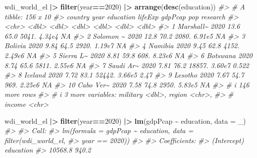 \documentclass[
  xelatex, ja=standard]{bxjsbook}
\newenvironment{Shaded}{\begin{snugshade}}{\end{snugshade}}
\newcommand{\AttributeTok}[1]{\textcolor[rgb]{0.13,0.29,0.53}{#1}}
\newcommand{\CommentTok}[1]{\textcolor[rgb]{0.56,0.35,0.01}{\textit{#1}}}
\newcommand{\DecValTok}[1]{\textcolor[rgb]{0.00,0.00,0.81}{#1}}
\newcommand{\FunctionTok}[1]{\textcolor[rgb]{0.13,0.29,0.53}{\textbf{#1}}}
\newcommand{\NormalTok}[1]{#1}
\newcommand{\SpecialCharTok}[1]{\textcolor[rgb]{0.81,0.36,0.00}{\textbf{#1}}}
\theoremstyle{definition}
\theoremstyle{definition}
\theoremstyle{definition}
\theoremstyle{definition}
\theoremstyle{remark}
\begin{document}
\begin{Shaded}
\begin{Highlighting}[]
\NormalTok{wdi\_world\_el }\SpecialCharTok{|\textgreater{}} \FunctionTok{filter}\NormalTok{(year}\SpecialCharTok{==}\DecValTok{2020}\NormalTok{) }\SpecialCharTok{|\textgreater{}} \FunctionTok{arrange}\NormalTok{(}\FunctionTok{desc}\NormalTok{(education))}
\CommentTok{\#\textgreater{} \# A tibble: 156 x 10}
\CommentTok{\#\textgreater{}    country    year education lifeExp gdpPcap    pop research}
\CommentTok{\#\textgreater{}    \textless{}chr\textgreater{}     \textless{}dbl\textgreater{}     \textless{}dbl\textgreater{}   \textless{}dbl\textgreater{}   \textless{}dbl\textgreater{}  \textless{}dbl\textgreater{}    \textless{}dbl\textgreater{}}
\CommentTok{\#\textgreater{}  1 Marshall\textasciitilde{}  2020     13.6     65.0   5041. 4.34e4   NA    }
\CommentTok{\#\textgreater{}  2 Solomon \textasciitilde{}  2020     12.8     70.2   2080. 6.91e5   NA    }
\CommentTok{\#\textgreater{}  3 Bolivia    2020      9.84    64.5   2920. 1.19e7   NA    }
\CommentTok{\#\textgreater{}  4 Namibia    2020      9.45    62.8   4152. 2.49e6   NA    }
\CommentTok{\#\textgreater{}  5 Sierra L\textasciitilde{}  2020      8.81    59.8    608. 8.23e6   NA    }
\CommentTok{\#\textgreater{}  6 Botswana   2020      8.74    65.6   5811. 2.55e6   NA    }
\CommentTok{\#\textgreater{}  7 Saudi Ar\textasciitilde{}  2020      7.81    76.2  18857. 3.60e7    0.522}
\CommentTok{\#\textgreater{}  8 Iceland    2020      7.72    83.1  52442. 3.66e5    2.47 }
\CommentTok{\#\textgreater{}  9 Lesotho    2020      7.67    54.7    969. 2.25e6   NA    }
\CommentTok{\#\textgreater{} 10 Cabo Ver\textasciitilde{}  2020      7.58    74.8   2950. 5.83e5   NA    }
\CommentTok{\#\textgreater{} \# i 146 more rows}
\CommentTok{\#\textgreater{} \# i 3 more variables: military \textless{}dbl\textgreater{}, region \textless{}chr\textgreater{},}
\CommentTok{\#\textgreater{} \#   income \textless{}chr\textgreater{}}
\end{Highlighting}
\end{Shaded}

\begin{Shaded}
\begin{Highlighting}[]
\NormalTok{wdi\_world\_el }\SpecialCharTok{|\textgreater{}} \FunctionTok{filter}\NormalTok{(year}\SpecialCharTok{==}\DecValTok{2020}\NormalTok{) }\SpecialCharTok{|\textgreater{}} \FunctionTok{lm}\NormalTok{(gdpPcap }\SpecialCharTok{\textasciitilde{}}\NormalTok{ education, }\AttributeTok{data =}\NormalTok{ \_)}
\CommentTok{\#\textgreater{} }
\CommentTok{\#\textgreater{} Call:}
\CommentTok{\#\textgreater{} lm(formula = gdpPcap \textasciitilde{} education, data = filter(wdi\_world\_el, }
\CommentTok{\#\textgreater{}     year == 2020))}
\CommentTok{\#\textgreater{} }
\CommentTok{\#\textgreater{} Coefficients:}
\CommentTok{\#\textgreater{} (Intercept)    education  }
\CommentTok{\#\textgreater{}     10568.8        940.2}
\end{Highlighting}
\end{Shaded}
\end{document}
